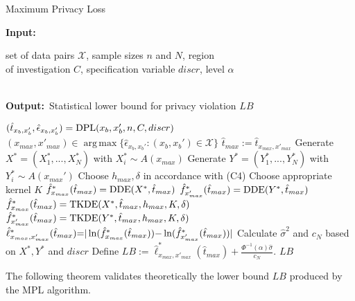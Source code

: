 \documentclass[conference]{IEEEtran}
\DeclareMathOperator*{\argmax}{arg\,max}
\renewcommand{\algorithmicrequire}{\textbf{Input:}}
\renewcommand{\algorithmicensure}{\textbf{Output:}}
\begin{document}
\begin{algorithm} 
	\caption{Maximum Privacy Loss}
	\small
	\algorithmicrequire \;\label{MPL} \parbox[t]{\dimexpr\linewidth-\algorithmicindent}{set of data pairs $\mathcal{X}$, sample sizes $n$ and $N$, region \\ of investigation $C$, specification variable $discr$, level $\alpha$} \\[0.2cm]
	\algorithmicensure \, Statistical lower bound for privacy violation $LB$
	\begin{algorithmic}[1]
	    	\State $(\hat{t}_{x_b,x'_b},\hat{\epsilon}_{x_b,x'_b}) = \textnormal{DPL}(x_b,x'_b,n,C,discr)$
	    \EndFor 
	    \State $(x_{max}, x'_{max}) \in \argmax\{\hat \epsilon_{x_b, x_b'}: (x_b, x_b') \in \mathcal{X}\} $
    	\State $ \hat{t}_{max} := \hat{t}_{x_{max}, x'_{max}}$
	    \State Generate $X^*=(X_1^*,...,X_N^*)$ with $ X_i^* \sim A(x_{{max}})$
	    \State Generate $Y^* = (Y_1^*,...,Y_N^*)$ with $Y_i^* \sim A(x_{{max}}')$
	    \State Choose $ h_{max},  \delta $ in accordance with (C4)
	    \State Choose appropriate kernel $K$
		    \State  $\hat f^*_{x_{max}} (\hat{t}_{max})=\textnormal{DDE}(X^*,\hat{t}_{max})$
	        \State $\hat f^*_{x'_{max}} (\hat{t}_{max})=\textnormal{DDE}(Y^*,\hat{t}_{max})$
		\Else 
		    \State $\hat{f}^*_{x_{max}}(\hat{t}_{max}) = \textnormal{TKDE}(X^*, \hat{t}_{max},h_{max},K,\delta)$
	        \State $\hat{f}^*_{x'_{max}} (\hat{t}_{max}) = \textnormal{TKDE}(Y^*, \hat{t}_{max},h_{max},K, \delta)$
		\EndIf
		\State $\hat{\ell}^*_{x_{max},x'_{max}}(\hat t_{max}) {\footnotesize =} \vert \ln(\hat{f}^*_{x_{max}}(\hat{t}_{max})) {\footnotesize -} \ln(\hat f^*_{x'_{max}} (\hat{t}_{max})) \vert $	
	    \State Calculate $\hat \sigma^2$ and $c_N$ based on $X^*, Y^*$ and $discr$
    	\State Define $LB := \hat \ell^*_{x_{max},x'_{max}}(\hat t_{max})+\frac{\Phi^{-1}(\alpha) \hat \sigma}{c_N}$.
		\State \Return $LB$
    \EndFunction
	\end{algorithmic} 
\end{algorithm}


The following theorem validates theoretically the lower bound $LB$ produced by the MPL algorithm.
\end{document}
